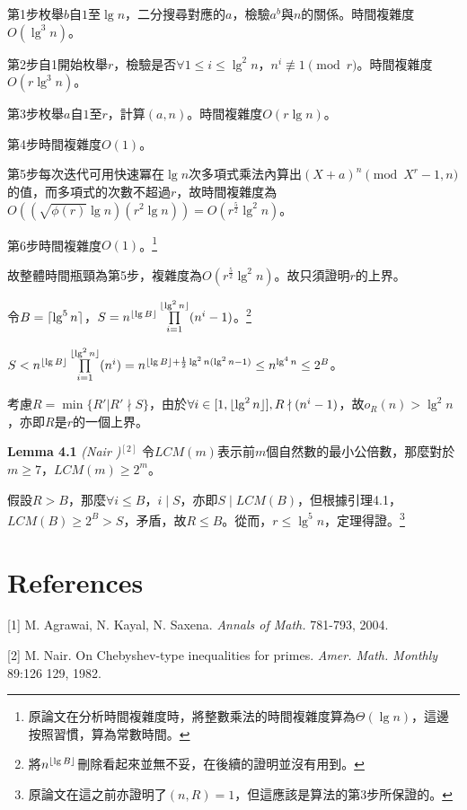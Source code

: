 \documentclass{article}
\DeclarePairedDelimiter\ceil{\lceil}{\rceil}
\DeclarePairedDelimiter\floor{\lfloor}{\rfloor}
\newcommand{\nequiv}{\not\equiv}
\begin{document}
    第1步枚舉$b$自$1$至$\lg n$，二分搜尋對應的$a$，檢驗$a^b$與$n$的關係。時間複雜度$O(\lg^3n)$。

    第2步自1開始枚舉$r$，檢驗是否$\forall 1\leq i\leq\lg^2n$，$n^i\nequiv 1\pmod{r}$。時間複雜度$O(r\lg^3n)$。

    第3步枚舉$a$自$1$至$r$，計算$(a,n)$。時間複雜度$O(r\lg n)$。

    第4步時間複雜度$O(1)$。

    第5步每次迭代可用快速冪在$\lg n$次多項式乘法內算出$(X+a)^n\pmod{X^r-1, n}$的值，而多項式的次數不超過$r$，故時間複雜度為$O((\sqrt{\phi(r)}\lg n)(r^2\lg n))=O(r^{\frac{5}{2}}\lg^2n)$。

    第6步時間複雜度$O(1)$。\footnote{原論文在分析時間複雜度時，將整數乘法的時間複雜度算為$\Theta(\lg n)$，這邊按照習慣，算為常數時間。}

    故整體時間瓶頸為第5步，複雜度為$O(r^{\frac{5}{2}}\lg^2n)$。故只須證明$r$的上界。

    令$B=\ceil{\lg^5n}$，$S=n^{\floor{\lg B}}\prod\limits_{i=1}^{\floor{\lg^2n}}(n^i-1)$。\footnote{將$n^{\floor{\lg B}}$刪除看起來並無不妥，在後續的證明並沒有用到。}

    $S<n^{\floor{\lg B}}\prod\limits_{i=1}^{\floor{\lg^2n}}(n^i)=n^{\floor{\lg B}+\frac{1}{2}\lg^2n(\lg^2n-1)}\leq n^{\lg^4n}\leq 2^B$。

    考慮$R=\min\{R'|R'\nmid S\}$，由於$\forall i\in[1, \floor{\lg^2n}], R\nmid(n^i-1)$，故$o_R(n)>\lg^2n$，亦即$R$是$r$的一個上界。

\begin{mdframed}
\noindent\textbf{Lemma 4.1} \textit{(Nair )}$^{[2]}$ 令$LCM(m)$表示前$m$個自然數的最小公倍數，那麼對於$m\geq 7$，$LCM(m)\geq 2^m$。
\end{mdframed}

    假設$R>B$，那麼$\forall i\leq B$，$i\mid S$，亦即$S\mid LCM(B)$，但根據引理4.1，$LCM(B)\geq 2^B>S$，矛盾，故$R\leq B$。從而，$r\leq \lg^5n$，定理得證。\footnote{原論文在這之前亦證明了$(n,R)=1$，但這應該是算法的第3步所保證的。}



\section{References}

    [1] M. Agrawai, N. Kayal, N. Saxena. \textit{Annals of Math.} 781-793, 2004.

    [2] M. Nair. On Chebyshev-type inequalities for primes. \textit{Amer. Math. Monthly} 89:126 129, 1982.
    
\end{document}
